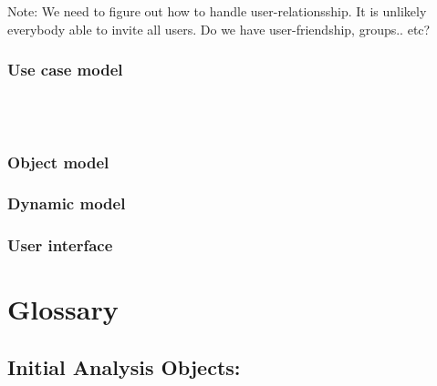 \documentclass{article}
\begin{document}
			Note: We need to figure out how to handle user-relationsship. 
			It is unlikely everybody able to invite all users. Do we have user-friendship, groups.. etc?

		\subsubsection{Use case model}
			
			\begin{center}
				\\
				\\
				
			\end{center}
		\subsubsection{Object model}
		\subsubsection{Dynamic model}
		\subsubsection{User interface}
\section{Glossary}
	\subsection{Initial Analysis Objects:}
	
\end{document}
